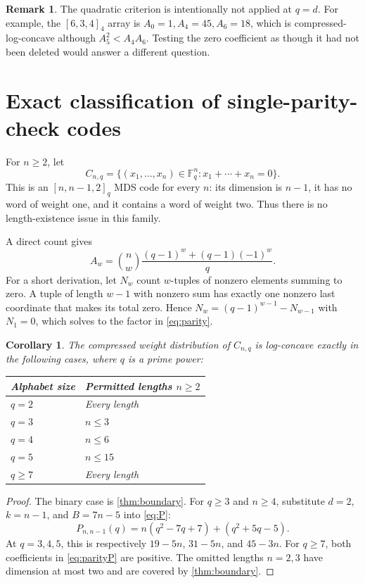 \documentclass[11pt,letterpaper]{article}
\numberwithin{equation}{section}
\newtheorem{corollary}[theorem]{Corollary}
\theoremstyle{definition}
\newtheorem{remark}[theorem]{Remark}
\newcommand{\F}{\mathbb F}
\begin{document}
\begin{remark}
The quadratic criterion is intentionally not applied at $q=d$.
For example, the $[6,3,4]_4$ array is
$A_0=1,A_4=45,A_6=18$, which is compressed-log-concave although
$A_5^2<A_4A_6$. Testing the zero coefficient as though it had not
been deleted would answer a different question.
\end{remark}

\section{Exact classification of single-parity-check codes}

For $n\ge2$, let
\[
 C_{n,q}=\{(x_1,\ldots,x_n)\in\F_q^n:x_1+\cdots+x_n=0\}.
\]
This is an $[n,n-1,2]_q$ MDS code for every $n$: its dimension is
$n-1$, it has no word of weight one, and it contains a word of weight
two. Thus there is no length-existence issue in this family.

A direct count gives
\begin{equation}\label{eq:parity}
 A_w=\binom nw\frac{(q-1)^w+(q-1)(-1)^w}{q}.
\end{equation}
For a short derivation, let $N_w$ count $w$-tuples of nonzero elements
summing to zero. A tuple of length $w-1$ with nonzero sum has exactly
one nonzero last coordinate that makes its total zero. Hence
$N_w=(q-1)^{w-1}-N_{w-1}$ with $N_1=0$, which solves to the factor
in \eqref{eq:parity}.

\begin{corollary}\label{cor:parity}
The compressed weight distribution of $C_{n,q}$ is log-concave
exactly in the following cases, where $q$ is a prime power:
\begin{center}
\begin{tabular}{@{}ll@{}}
\toprule
Alphabet size & Permitted lengths $n\ge2$\\
\midrule
$q=2$ & Every length\\
$q=3$ & $n\le3$\\
$q=4$ & $n\le6$\\
$q=5$ & $n\le15$\\
$q\ge7$ & Every length\\
\bottomrule
\end{tabular}
\end{center}
\end{corollary}
\begin{proof}
The binary case is \cref{thm:boundary}. For $q\ge3$ and $n\ge4$,
substitute $d=2$, $k=n-1$, and $B=7n-5$ into \eqref{eq:P}:
\begin{equation}\label{eq:parityP}
 P_{n,n-1}(q)=n(q^2-7q+7)+(q^2+5q-5).
\end{equation}
At $q=3,4,5$, this is respectively $19-5n$, $31-5n$, and
$45-3n$. For $q\ge7$, both coefficients in \eqref{eq:parityP}
are positive. The omitted lengths $n=2,3$ have dimension at most
two and are covered by \cref{thm:boundary}.
\end{proof}
\end{document}
